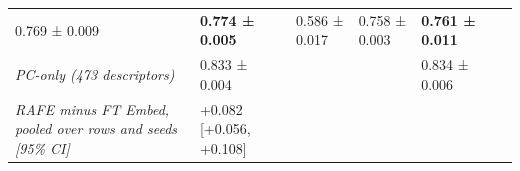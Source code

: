 \documentclass[
  10pt,
]{article}
\begin{document}
\begin{longtable}[]{@{}lllllll@{}}
\begin{minipage}[t]{0.12\columnwidth}
0.769 ± 0.009\strut
\end{minipage} & \begin{minipage}[t]{0.12\columnwidth}\raggedright
\textbf{0.774 ± 0.005}\strut
\end{minipage} & \begin{minipage}[t]{0.12\columnwidth}\raggedright
0.586 ± 0.017\strut
\end{minipage} & \begin{minipage}[t]{0.12\columnwidth}\raggedright
0.758 ± 0.003\strut
\end{minipage} & \begin{minipage}[t]{0.12\columnwidth}\raggedright
\textbf{0.761 ± 0.011}\strut
\end{minipage}\tabularnewline
\begin{minipage}[t]{0.12\columnwidth}\raggedright
\emph{PC-only (473 descriptors)}\strut
\end{minipage} & \begin{minipage}[t]{0.12\columnwidth}\raggedright
0.833 ± 0.004\strut
\end{minipage} & \begin{minipage}[t]{0.12\columnwidth}\raggedright
\strut
\end{minipage} & \begin{minipage}[t]{0.12\columnwidth}\raggedright
\strut
\end{minipage} & \begin{minipage}[t]{0.12\columnwidth}\raggedright
0.834 ± 0.006\strut
\end{minipage} & \begin{minipage}[t]{0.12\columnwidth}\raggedright
\strut
\end{minipage} & \begin{minipage}[t]{0.12\columnwidth}\raggedright
\strut
\end{minipage}\tabularnewline
\begin{minipage}[t]{0.12\columnwidth}\raggedright
\emph{RAFE minus FT Embed, pooled over rows and seeds {[}95\%
CI{]}}\strut
\end{minipage} & \begin{minipage}[t]{0.12\columnwidth}\raggedright
+0.082 {[}+0.056, +0.108{]}\strut
\end{minipage} & \begin{minipage}[t]{0.12\columnwidth}\raggedright
\strut
\end{minipage} & \begin{minipage}[t]{0.12\columnwidth}\raggedright
\strut
\end{minipage} & \begin{minipage}[t]{0.12\columnwidth}\raggedright

\end{minipage}
\end{longtable}
\end{document}
